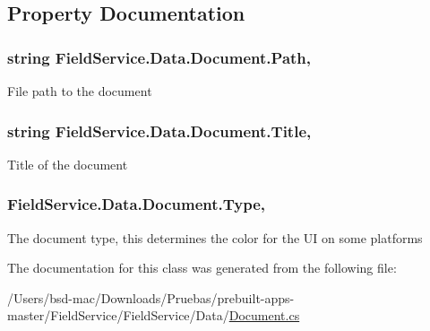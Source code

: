 \subsection{Property Documentation}
\hypertarget{class_field_service_1_1_data_1_1_document_aae4ed3cf3bd0a2a557f4d24579bb0112}{
\subsubsection[{Path}]{\setlength{\rightskip}{0pt plus 5cm}string Field\+Service.\+Data.\+Document.\+Path\hspace{0.3cm}{\ttfamily [get]}, {\ttfamily [set]}}}\label{class_field_service_1_1_data_1_1_document_aae4ed3cf3bd0a2a557f4d24579bb0112}


File path to the document 

\hypertarget{class_field_service_1_1_data_1_1_document_af92a5f47393e199f8909bcf2aa0c13e2}{
\subsubsection[{Title}]{\setlength{\rightskip}{0pt plus 5cm}string Field\+Service.\+Data.\+Document.\+Title\hspace{0.3cm}{\ttfamily [get]}, {\ttfamily [set]}}}\label{class_field_service_1_1_data_1_1_document_af92a5f47393e199f8909bcf2aa0c13e2}


Title of the document 

\hypertarget{class_field_service_1_1_data_1_1_document_aa7b74e1c242b948ff58daa73cd282d37}{
\subsubsection[{Type}]{ Field\+Service.\+Data.\+Document.\+Type\hspace{0.3cm}{\ttfamily [get]}, {\ttfamily [set]}}}\label{class_field_service_1_1_data_1_1_document_aa7b74e1c242b948ff58daa73cd282d37}


The document type, this determines the color for the U\+I on some platforms 



The documentation for this class was generated from the following file\+:\begin{DoxyCompactItemize}
\item 
/\+Users/bsd-\/mac/\+Downloads/\+Pruebas/prebuilt-\/apps-\/master/\+Field\+Service/\+Field\+Service/\+Data/\hyperlink{_document_8cs}{Document.\+cs}\end{DoxyCompactItemize}
